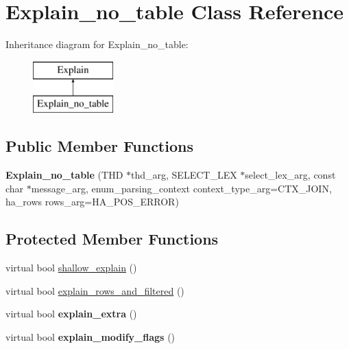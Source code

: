 \hypertarget{classExplain__no__table}{}\section{Explain\+\_\+no\+\_\+table Class Reference}
\label{classExplain__no__table}
Inheritance diagram for Explain\+\_\+no\+\_\+table\+:\begin{figure}[H]
\begin{center}
\leavevmode
\includegraphics[height=2.000000cm]{classExplain__no__table}
\end{center}
\end{figure}
\subsection*{Public Member Functions}
\begin{DoxyCompactItemize}
\item 
\mbox{\label{classExplain__no__table_a3f8df8ac4ef3f5c6bbba8624b6356133}} 
{\bfseries Explain\+\_\+no\+\_\+table} (T\+HD $\ast$thd\+\_\+arg, S\+E\+L\+E\+C\+T\+\_\+\+L\+EX $\ast$select\+\_\+lex\+\_\+arg, const char $\ast$message\+\_\+arg, enum\+\_\+parsing\+\_\+context context\+\_\+type\+\_\+arg=C\+T\+X\+\_\+\+J\+O\+IN, ha\+\_\+rows rows\+\_\+arg=H\+A\+\_\+\+P\+O\+S\+\_\+\+E\+R\+R\+OR)
\end{DoxyCompactItemize}
\subsection*{Protected Member Functions}
\begin{DoxyCompactItemize}
\item 
virtual bool \mbox{\hyperlink{classExplain__no__table_abb0311250686fc0cb30d9632150312eb}{shallow\+\_\+explain}} ()
\item 
virtual bool \mbox{\hyperlink{classExplain__no__table_a6713209630b904160dfc00bac9841370}{explain\+\_\+rows\+\_\+and\+\_\+filtered}} ()
\item 
\mbox{\label{classExplain__no__table_a030d6708b091fbd00a17ed1d8e703593}} 
virtual bool {\bfseries explain\+\_\+extra} ()
\item 
\mbox{\label{classExplain__no__table_a1c2f71a7fee101c0a0e417327958a987}} 
virtual bool {\bfseries explain\+\_\+modify\+\_\+flags} ()
\end{DoxyCompactItemize}

